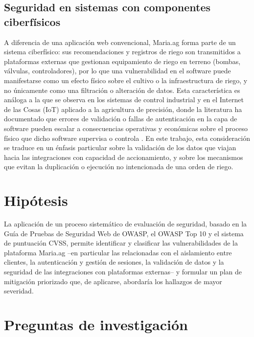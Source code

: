 \documentclass[12pt,letterpaper]{report}
\begin{document}
\section*{Seguridad en sistemas con componentes ciberfísicos}

A diferencia de una aplicación web convencional, Maria.ag forma parte de un
sistema ciberfísico: sus recomendaciones y registros de riego son transmitidos
a plataformas externas que gestionan equipamiento de riego en terreno
(bombas, válvulas, controladores), por lo que una vulnerabilidad en el
software puede manifestarse como un efecto físico sobre el cultivo o la
infraestructura de riego, y no únicamente como una filtración o alteración de
datos. Esta característica es análoga a la que se observa en los sistemas de
control industrial y en el Internet de las Cosas (IoT) aplicado a la
agricultura de precisión, donde la literatura ha documentado que errores de
validación o fallas de autenticación en la capa de software pueden escalar a
consecuencias operativas y económicas sobre el proceso físico que dicho
software supervisa o controla \autocite{fathy2023secure}. En este trabajo,
esta consideración se traduce en un énfasis particular sobre la validación de
los datos que viajan hacia las integraciones con capacidad de accionamiento, y
sobre los mecanismos que evitan la duplicación o ejecución no intencionada de
una orden de riego.

\newpage
\chapter*{Hipótesis}

La aplicación de un proceso sistemático de evaluación de seguridad, basado en la Guía de Pruebas de Seguridad Web de OWASP, el OWASP Top 10 y el sistema de puntuación CVSS, permite identificar y clasificar las vulnerabilidades de la plataforma Maria.ag --en particular las relacionadas con el aislamiento entre clientes, la autenticación y gestión de sesiones, la validación de datos y la seguridad de las integraciones con plataformas externas-- y formular un plan de mitigación priorizado que, de aplicarse, abordaría los hallazgos de mayor severidad.

\newpage

\chapter*{Preguntas de investigación}
\end{document}
